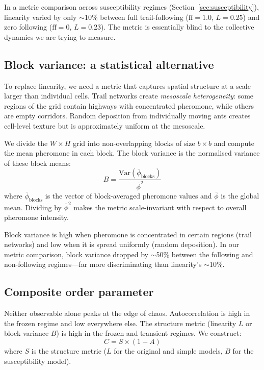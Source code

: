 \documentclass[11pt,a4paper]{article}
\begin{document}
In a metric comparison across susceptibility regimes (Section~\ref{sec:susceptibility}), linearity varied by only $\sim$10\% between full trail-following ($\text{ff} = 1.0$, $L = 0.25$) and zero following ($\text{ff} = 0$, $L = 0.23$).
The metric is essentially blind to the collective dynamics we are trying to measure.

\subsection{Block variance: a statistical alternative}

To replace linearity, we need a metric that captures spatial structure at a scale larger than individual cells.
Trail networks create \emph{mesoscale heterogeneity}: some regions of the grid contain highways with concentrated pheromone, while others are empty corridors.
Random deposition from individually moving ants creates cell-level texture but is approximately uniform at the mesoscale.

We divide the $W \times H$ grid into non-overlapping blocks of size $b \times b$ and compute the mean pheromone in each block.
The block variance is the normalised variance of these block means:
\begin{equation}
  B = \frac{\text{Var}(\bar\phi_{\text{blocks}})}{\bar\phi^2}
  \label{eq:block_variance}
\end{equation}
where $\bar\phi_{\text{blocks}}$ is the vector of block-averaged pheromone values and $\bar\phi$ is the global mean.
Dividing by $\bar\phi^2$ makes the metric scale-invariant with respect to overall pheromone intensity.

Block variance is high when pheromone is concentrated in certain regions (trail networks) and low when it is spread uniformly (random deposition).
In our metric comparison, block variance dropped by $\sim$50\% between the following and non-following regimes---far more discriminating than linearity's $\sim$10\%.

\subsection{Composite order parameter}

Neither observable alone peaks at the edge of chaos.
Autocorrelation is high in the frozen regime and low everywhere else.
The structure metric (linearity $L$ or block variance $B$) is high in the frozen and transient regimes.
We construct:
\begin{equation}
  C = S \times (1 - A)
  \label{eq:composite}
\end{equation}
where $S$ is the structure metric ($L$ for the original and simple models, $B$ for the susceptibility model).
\end{document}

